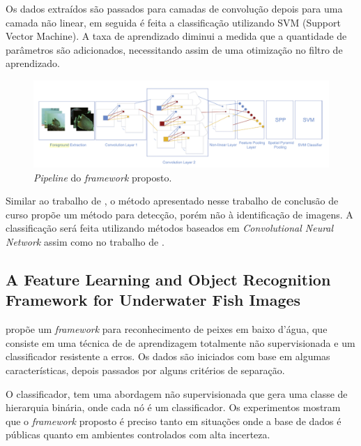Os dados extraídos são passados para camadas de convolução depois para uma camada não linear, em seguida é feita a classificação utilizando SVM (Support Vector Machine). A taxa de aprendizado diminui a medida que a quantidade de parâmetros são adicionados, necessitando assim de uma otimização no filtro de aprendizado. 

\begin{figure}[h]
	\caption{\label{fig:trainignqin}\textit{Pipeline} do \textit{framework} proposto.}
	\begin{center}
	    \includegraphics[width=1\textwidth]{resources/trainingqin}
	\end{center}
\end{figure}
   

Similar ao trabalho de , o método apresentado nesse trabalho de conclusão de curso propõe um método para detecção, porém não à identificação de imagens. A classificação será feita utilizando métodos baseados em \textit{Convolutional Neural Network} assim como no trabalho de .



\subsection{A Feature Learning and Object Recognition Framework for Underwater Fish Images}
 propõe um \textit{framework} para reconhecimento de peixes em baixo d'água, que consiste em uma técnica de de aprendizagem totalmente não supervisionada e um classificador resistente a erros. Os dados são iniciados com base em algumas características, depois passados por alguns critérios de separação. 

O classificador, tem uma abordagem não supervisionada que gera uma classe de hierarquia binária, onde cada nó é um classificador. Os experimentos mostram que o \textit{framework} proposto é preciso tanto em situações onde a base de dados é públicas quanto em ambientes controlados com alta incerteza.

